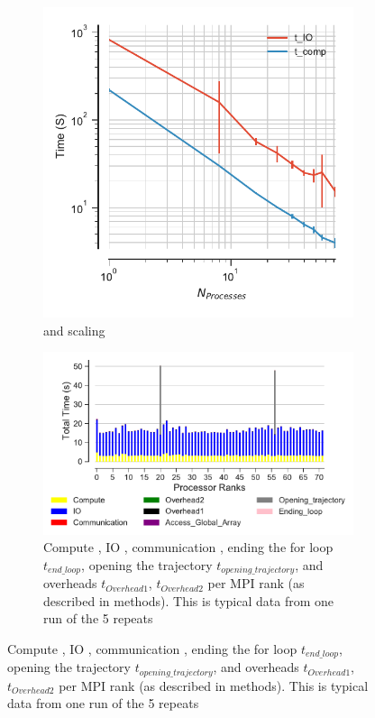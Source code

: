 \begin{figure}[ht!]
\begin{subfigure}{.4\textwidth}
  \includegraphics[width=\linewidth]{figures/RMSD-ga4py-time_IO_comparison.pdf}
\caption{\tcomp and \tIO scaling}
\label{fig:ScalingComputeIO-ga4py}
\end{subfigure}
\hfill
\begin{subfigure} {.5\textwidth}
  \includegraphics[width=\linewidth]{figures/RMSD-ga4py-BarPlot-rank-comparison_72_1.pdf}
  \caption{Compute \tcomp, IO \tIO, communication \tcomm , ending the for loop $t_{end\_loop}$,
  opening the trajectory $t_{opening\_trajectory}$, and overheads $t_{Overhead1}$,  $t_{Overhead2}$ per MPI rank (as described in methods).
  This is typical data from one run of the 5 repeats}
  \label{fig:MPIranks-ga4py}
\end{subfigure}


\end{figure}
